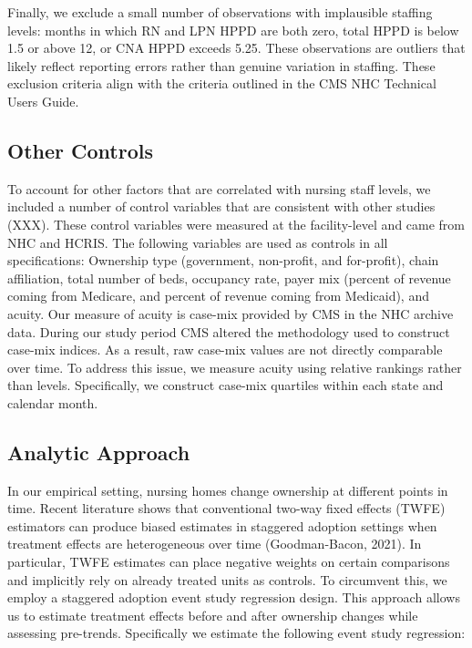 \documentclass[preprint,authoryear]{elsarticle}
\begin{document}
Finally, we exclude a small number of observations with implausible staffing levels: months in which RN and LPN HPPD are both zero, total HPPD is below 1.5 or above 12, or CNA HPPD exceeds 5.25. These observations are outliers that likely reflect reporting errors rather than genuine variation in staffing. These exclusion criteria align with the criteria outlined in the CMS NHC Technical Users Guide.

\subsection{Other Controls}

To account for other factors that are correlated with nursing staff levels, we included a number of control variables that are consistent with other studies (XXX). These control variables were measured at the facility-level and came from NHC and HCRIS. The following variables are used as controls in all specifications: Ownership type (government, non-profit, and for-profit), chain affiliation, total number of beds, occupancy rate, payer mix (percent of revenue coming from Medicare, and percent of revenue coming from Medicaid), and acuity. Our measure of acuity is case-mix provided by CMS in the NHC archive data. During our study period CMS altered the methodology used to construct case-mix indices. As a result, raw case-mix values are not directly comparable over time. To address this issue, we measure acuity using relative rankings rather than levels. Specifically, we construct case-mix quartiles within each state and calendar month.

\subsection{Analytic Approach}

In our empirical setting, nursing homes change ownership at different points in time. Recent literature shows that conventional two-way fixed effects (TWFE) estimators can produce biased estimates in staggered adoption settings when treatment effects are heterogeneous over time (Goodman-Bacon, 2021). In particular, TWFE estimates can place negative weights on certain comparisons and implicitly rely on already treated units as controls. To circumvent this, we employ a staggered adoption event study regression design. This approach allows us to estimate treatment effects before and after ownership changes while assessing pre-trends. Specifically we estimate the following event study regression:
\end{document}
